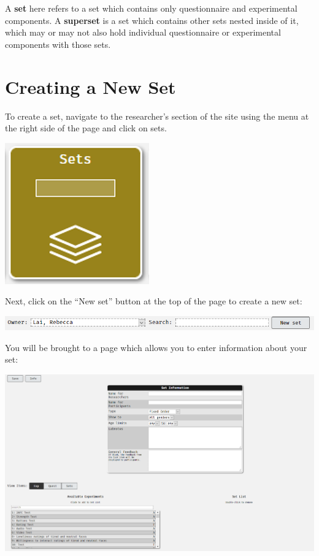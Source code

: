 \documentclass[]{book}
\begin{document}
A \textbf{set} here refers to a set which contains only questionnaire
and experimental components. A \textbf{superset} is a set which contains
other sets nested inside of it, which may or may not also hold
individual questionnaire or experimental components with those sets.

\hypertarget{new_sets}{\section{Creating a New Set}\label{new_sets}}

To create a set, navigate to the researcher's section of the site using
the menu at the right side of the page and click on sets.

\includegraphics{images/screenshots/sets_1.png}

Next, click on the ``New set'' button at the top of the page to create a
new set:

\includegraphics{images/screenshots/sets_2.png}

You will be brought to a page which allows you to enter information
about your set:

\includegraphics{images/screenshots/sets_3.png}
\end{document}
